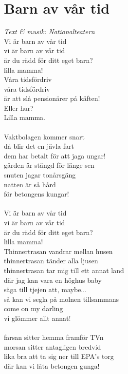 \section{Barn av vår tid}
\textit{Text \& musik: Nationalteatern}
\vspace{2mm}\\
Vi är barn av vår tid\\
vi är barn av vår tid\\
är du rädd för ditt eget barn?\\
lilla mamma!\\
Våra tidsfördriv\\
våra tidsfördriv\\
är att slå pensionärer på käften!\\
Eller hur?\\
Lilla mamma.\\
\\
Vaktbolagen kommer snart\\
då blir det en jävla fart\\
dem har betalt för att jaga ungar!\\
gården är stängd för länge sen\\
snuten jagar tonårsgäng\\
natten är så hård\\
för betongens kungar!\\
\\
Vi är barn av vår tid\\
vi är barn av vår tid\\
är du rädd för ditt eget barn?\\
lilla mamma!\\
\newpage
\noindent Thinnertrasan vandrar mellan husen\\
thinnertrasan tänder alla ljusen\\
thinnertrasan tar mig till ett annat land\\
där jag kan vara en höghus baby\\
säga till tjejen att, maybe...\\
så kan vi segla på molnen tillsammans\\
come on my darling\\
vi glömmer allt annat!\\
\\
farsan sitter hemma framför TVn\\
morsan sitter antagligen bredvid\\
lika bra att ta sig ner till EPA's torg\\
där kan vi låta betongen gunga!\\
